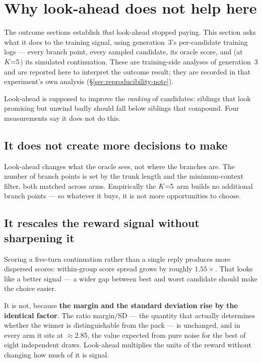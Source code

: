 \section{Why look-ahead does not help here}
\label{sec:mechanism}

The outcome sections establish \emph{that} look-ahead stopped paying. This section asks what
it does to the training signal, using generation~3's per-candidate training logs --- every
branch point, every sampled candidate, its oracle score, and (at $K{=}5$) its simulated
continuation. These are training-side analyses of generation~3 and are reported here to
interpret the outcome result; they are recorded in that experiment's own analysis
(\S\ref{sec:reproducibility-note}).

Look-ahead is supposed to improve the \emph{ranking} of candidates: siblings that look
promising but unwind badly should fall below siblings that compound. Four measurements say it
does not do this.

\subsection{It does not create more decisions to make}
Look-ahead changes what the oracle sees, not where the branches are. The number of branch
points is set by the trunk length and the minimum-context filter, both matched across arms.
Empirically the $K{=}5$ arm builds no additional branch points --- so whatever it buys, it is
not more opportunities to choose.

\subsection{It rescales the reward signal without sharpening it}
\label{sec:spread}
Scoring a five-turn continuation rather than a single reply produces more dispersed scores:
within-group score spread grows by roughly $1.55\times$. That looks like a better signal --- a
wider gap between best and worst candidate should make the choice easier.

It is not, because \textbf{the margin and the standard deviation rise by the identical
factor}. The ratio margin$/$SD --- the quantity that actually determines whether the winner is
distinguishable from the pack --- is unchanged, and in every arm it sits at
${\approx}2.85$, the value expected from pure noise for the best of eight independent draws.
Look-ahead multiplies the units of the reward without changing how much of it is signal.

